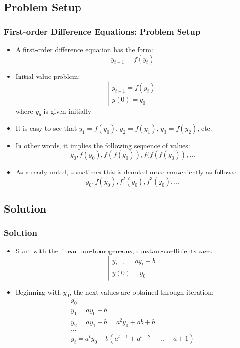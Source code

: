 \documentclass[10pt,usenames,dvipsnames]{beamer}
\theoremstyle{plain}
\theoremstyle{definition}
\begin{document}
\subsection{Problem Setup}
\begin{frame}[fragile]
\frametitle{First-order Difference Equations: Problem Setup}
\begin{itemize}
	\item A first-order difference equation has the form:
	\[
		y_{t+1} = f(y_{t})
	\]
	\item Initial-value problem:
	\[
		\left|
		\begin{array}{lcl}
			y_{t+1} = f(y_{t})\\
			y(0) = y_{0}
		\end{array}
		\right.
	\]
	where $y_{0}$ is given initially
	\item It is easy to see that $y_{1} = f(y_{0}),\, y_{2} = f(y_{1}),\, y_{3} = f(y_{2})$, etc.
	\item In other words, it implies the following sequence of values:
	\[
		y_{0}, f(y_{0}), f(f(y_{0})), f(f(f(y_{0})),\ldots
	\]
	\item As already noted, sometimes this is denoted more conveniently as follows:
	\[
		y_{0}, f(y_{0}), f^{2}(y_{0}), f^{3}(y_{0}),\ldots
	\]
\end{itemize}
\end{frame}

\subsection{Solution}
\begin{frame}[fragile]
\frametitle{Solution}
\begin{itemize}
	\item Start with the linear non-homogeneous, constant-coefficients case:
	\[
		\left|
		\begin{array}{lcl}
			y_{t+1} = ay_{t} + b\\
			y(0) = y_{0}
		\end{array}
		\right.
	\]
	\item Beginning with $y_{0}$, the next values are obtained through iteration:
	\[
		\begin{array}{lcl}
			y_{0}\\
			y_{1} = ay_{0} + b\\
			y_{2} = ay_{1} + b = a^{2}y_{0} + ab + b\\
			\ldots\\
			y_{t} = a^{t}y_{0} + b(a^{t-1} + a^{t-2} + \ldots + a + 1)
		\end{array}
	\]
\end{itemize}
\end{frame}
\end{document}
